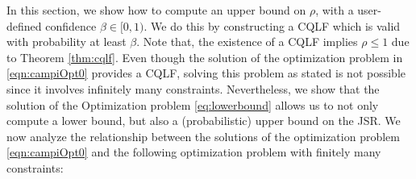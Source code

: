 In this section, we show how to compute an upper bound on $\rho$, with a user-defined confidence $\beta \in [0, 1)$. We do this by constructing a CQLF which is valid with probability at least $\beta$. Note that, the existence of a CQLF implies $\rho \leq 1$ due to Theorem \ref{thm:cqlf}.
Even though the solution of the optimization problem in \eqref{eqn:campiOpt0} provides a CQLF, solving this problem as stated is not possible since it involves infinitely many constraints. Nevertheless, we show that the solution of the Optimization problem \eqref{eq:lowerbound} allows us to not only compute a lower bound, but also a (probabilistic) upper bound on the JSR.
We now analyze the relationship between the solutions of the optimization problem \eqref{eqn:campiOpt0} and the following optimization problem with finitely many constraints:
